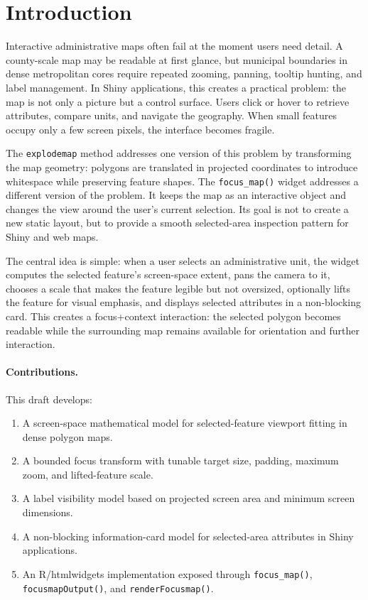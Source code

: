 \documentclass[12pt, a4paper]{article}
\numberwithin{equation}{section}
\begin{document}
\newpage
\tableofcontents
\newpage

\section{Introduction}

Interactive administrative maps often fail at the moment users need detail. A county-scale map may be readable at first glance, but municipal boundaries in dense metropolitan cores require repeated zooming, panning, tooltip hunting, and label management. In Shiny applications, this creates a practical problem: the map is not only a picture but a control surface. Users click or hover to retrieve attributes, compare units, and navigate the geography. When small features occupy only a few screen pixels, the interface becomes fragile.

The \texttt{explodemap} method addresses one version of this problem by transforming the map geometry: polygons are translated in projected coordinates to introduce whitespace while preserving feature shapes. The \texttt{focus\_map()} widget addresses a different version of the problem. It keeps the map as an interactive object and changes the view around the user's current selection. Its goal is not to create a new static layout, but to provide a smooth selected-area inspection pattern for Shiny and web maps.

The central idea is simple: when a user selects an administrative unit, the widget computes the selected feature's screen-space extent, pans the camera to it, chooses a scale that makes the feature legible but not oversized, optionally lifts the feature for visual emphasis, and displays selected attributes in a non-blocking card. This creates a focus+context interaction: the selected polygon becomes readable while the surrounding map remains available for orientation and further interaction.

\paragraph{Contributions.} This draft develops:
\begin{enumerate}
  \item A screen-space mathematical model for selected-feature viewport fitting in dense polygon maps.
  \item A bounded focus transform with tunable target size, padding, maximum zoom, and lifted-feature scale.
  \item A label visibility model based on projected screen area and minimum screen dimensions.
  \item A non-blocking information-card model for selected-area attributes in Shiny applications.
  \item An \textsf{R}/htmlwidgets implementation exposed through \texttt{focus\_map()}, \texttt{focusmapOutput()}, and \texttt{renderFocusmap()}.
\end{enumerate}
\end{document}
